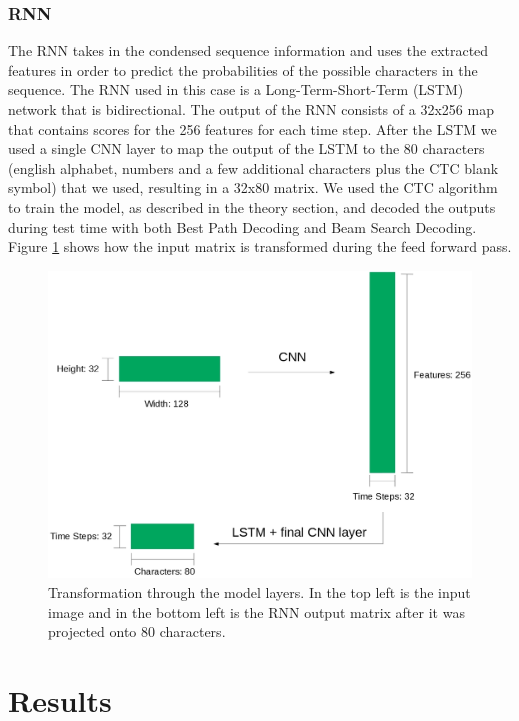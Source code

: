 \documentclass{article}
\begin{document}
\subsubsection{RNN}
The RNN takes in the condensed sequence information and uses the extracted features in order to predict the probabilities of the possible characters in the sequence. The RNN used in this case is a Long-Term-Short-Term (LSTM) network that is bidirectional. The output of the RNN consists of a 32x256 map that contains scores for the 256 features for each time step. After the LSTM we used a single CNN layer to map the output of the LSTM to the 80 characters (english alphabet, numbers and a few additional characters plus the CTC blank symbol) that we used, resulting in a 32x80 matrix. We used the CTC algorithm to train the model, as described in the theory section, and decoded the outputs during test time with both Best Path Decoding and Beam Search Decoding. Figure \ref{fig:featureshapes} shows how the input matrix is transformed during the feed forward pass.
\begin{figure}[H]
\begin{center}
\includegraphics[scale=0.25]{rsz_pipeline}
\end{center}
\caption{Transformation through the model layers. In the top left is the input image and in the bottom left is the RNN output matrix after it was projected onto 80 characters.}
\label{fig:featureshapes}
\end{figure}

\newpage
\section{Results}
\end{document}
